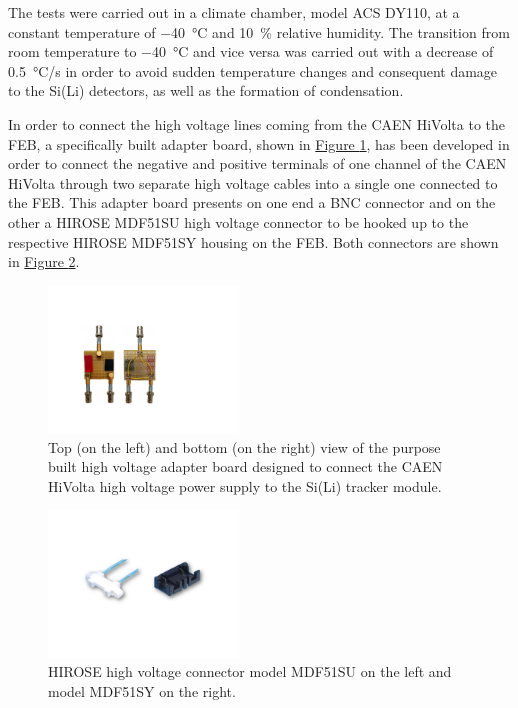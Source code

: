 \par
The tests were carried out in a climate chamber, model ACS DY110, at a constant temperature of \SI{-40}{\celsius} and \SI{10}{\percent} relative humidity. The transition from room temperature to \SI{-40}{\celsius} and vice versa was carried out with a decrease of \SI{0.5}{\celsius/\second} in order to avoid sudden temperature changes and consequent damage to the Si(Li) detectors, as well as the formation of condensation.

\par
In order to connect the high voltage lines coming from the CAEN HiVolta to the FEB, a specifically built adapter board, shown in \hyperref[figHiVoltAdapterBoard]{Figure \ref{figHiVoltAdapterBoard}}, has been developed in order to connect the negative and positive terminals of one channel of the CAEN HiVolta through two separate high voltage cables into a single one connected to the FEB. This adapter board presents on one end a BNC connector and on the other a HIROSE MDF51SU high voltage connector to be hooked up to the respective HIROSE MDF51SY housing on the FEB. Both connectors are shown in \hyperref[figHVPSconn]{Figure \ref{figHVPSconn}}.

\par


\begin{figure}[h!]
    \centering
    \includegraphics[width=0.45\textwidth]{Images/chap3/hivoltage_adapter_board.pdf}
    \caption{Top (on the left) and bottom (on the right) view of the purpose built high voltage adapter board designed to connect the CAEN HiVolta high voltage power supply to the Si(Li) tracker module.}
    \label{figHiVoltAdapterBoard}
\end{figure}

\begin{figure}[h!]
    \centering
    \includegraphics[width=0.45\textwidth]{Images/chap3/connectors_high_voltage.pdf}
    \caption{HIROSE high voltage connector model MDF51SU on the left and model MDF51SY on the right.}
    \label{figHVPSconn}
\end{figure}

